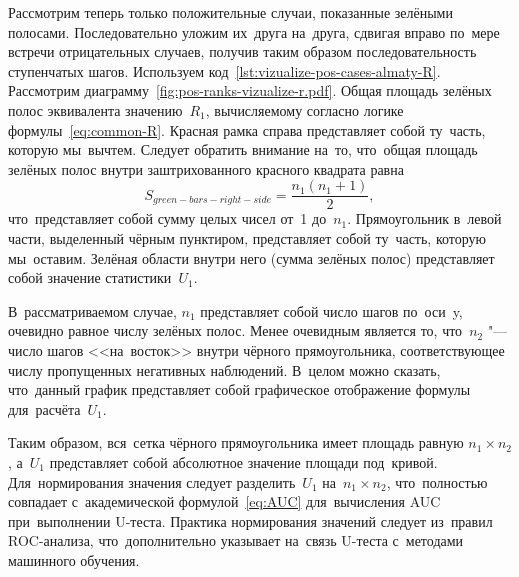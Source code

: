\documentclass[]{scrreprt}
\begin{document}
Рассмотрим теперь только положительные случаи, показанные зелёными полосами. Последовательно уложим их~друга на~друга, сдвигая вправо по~мере встречи отрицательных случаев, получив таким образом последовательность ступенчатых шагов. Используем код~\ref{lst:vizualize-pos-cases-almaty-R}. Рассмотрим диаграмму~\ref{fig:pos-ranks-vizualize-r.pdf}. Общая площадь зелёных полос эквивалента значению~$R_{1}$, вычисляемому согласно логике формулы~\ref{eq:common-R}.  Красная рамка справа представляет собой ту~часть, которую мы~вычтем. Следует обратить внимание на~то, что~общая площадь зелёных полос внутри заштрихованного красного квадрата равна
\begin{equation}\label{eq:R-1}
S_{green-bars-right-side}=\frac{n_{1}(n_{1}+1)}{2},
\end{equation}
что~представляет собой сумму целых чисел от~1 до~$n_{1}$. Прямоугольник в~левой части, выделенный чёрным пунктиром, представляет собой ту~часть, которую мы~оставим. Зелёная области внутри него (сумма зелёных полос) представляет собой значение статистики~$U_{1}$.

В~рассматриваемом случае, $n_{1}$ представляет собой число шагов по~оси~y, очевидно равное числу зелёных полос. Менее очевидным является то, что~$n_{2}$ "--- число шагов <<на~восток>> внутри чёрного прямоугольника, соответствующее числу пропущенных негативных наблюдений. В~целом можно сказать, что~данный график представляет собой графическое отображение формулы для~расчёта~$U_{1}$.

Таким образом, вся~сетка чёрного прямоугольника имеет площадь равную $n_{1} \times n_{2}$, а~$U_{1}$ представляет собой абсолютное значение площади под~кривой. Для~нормирования значения следует разделить~$U_{1}$ на~$n_{1} \times n_{2}$, что~полностью совпадает с~академической формулой~\ref{eq:AUC} для~вычисления AUC при~выполнении U-теста. Практика нормирования значений следует из~правил ROC-анализа, что~дополнительно указывает на~связь U-теста с~методами машинного обучения.
\end{document}
